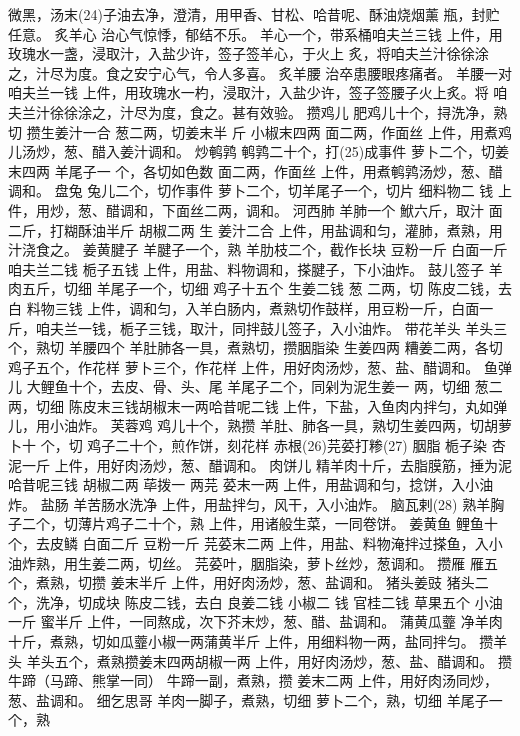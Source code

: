 \documentclass[12pt,UTF8]{ctexbook}
\begin{document}
微黑，汤末(24)子油去净，澄清，用甲香、甘松、哈昔呢、酥油烧烟薰
瓶，封贮任意。
炙羊心 治心气惊悸，郁结不乐。
羊心一个，带系桶咱夫兰三钱
上件，用玫瑰水一盏，浸取汁，入盐少许，签子签羊心，于火上
炙，将咱夫兰汁徐徐涂之，汁尽为度。食之安宁心气，令人多喜。
炙羊腰 治卒患腰眼疼痛者。
羊腰一对 咱夫兰一钱
上件，用玫瑰水一杓，浸取汁，入盐少许，签子签腰子火上炙。将
咱夫兰汁徐徐涂之，汁尽为度，食之。甚有效验。
攒鸡儿
肥鸡儿十个，挦洗净，熟切 攒生姜汁一合 葱二两，切姜末半
斤 小椒末四两 面二两，作面丝
上件，用煮鸡儿汤炒，葱、醋入姜汁调和。
炒鹌鹑
鹌鹑二十个，打(25)成事件 萝卜二个，切姜末四两 羊尾子一
个，各切如色数 面二两，作面丝
上件，用煮鹌鹑汤炒，葱、醋调和。
盘兔
兔儿二个，切作事件 萝卜二个，切羊尾子一个，切片 细料物二
钱
上件，用炒，葱、醋调和，下面丝二两，调和。
河西肺
羊肺一个 鮲六斤，取汁 面二斤，打糊酥油半斤 胡椒二两 生
姜汁二合
上件，用盐调和匀，灌肺，煮熟，用汁浇食之。
姜黄腱子
羊腱子一个，熟 羊肋枝二个，截作长块 豆粉一斤 白面一斤
咱夫兰二钱 栀子五钱
上件，用盐、料物调和，搽腱子，下小油炸。
鼓儿签子
羊肉五斤，切细 羊尾子一个，切细 鸡子十五个 生姜二钱 葱
二两，切 陈皮二钱，去白 料物三钱
上件，调和匀，入羊白肠内，煮熟切作鼓样，用豆粉一斤，白面一
斤，咱夫兰一钱，栀子三钱，取汁，同拌鼓儿签子，入小油炸。
带花羊头
羊头三个，熟切 羊腰四个 羊肚肺各一具，煮熟切，攒胭脂染
生姜四两 糟姜二两，各切 鸡子五个，作花样 萝卜三个，作花样
上件，用好肉汤炒，葱、盐、醋调和。
鱼弹儿
大鲤鱼十个，去皮、骨、头、尾 羊尾子二个，同剁为泥生姜一
两，切细 葱二两，切细 陈皮末三钱胡椒末一两哈昔呢二钱
上件，下盐，入鱼肉内拌匀，丸如弹儿，用小油炸。
芙蓉鸡
鸡儿十个，熟攒 羊肚、肺各一具，熟切生姜四两，切胡萝卜十
个，切 鸡子二十个，煎作饼，刻花样 赤根(26)芫荽打糁(27) 胭脂
栀子染 杏泥一斤
上件，用好肉汤炒，葱、醋调和。
肉饼儿
精羊肉十斤，去脂膜筋，捶为泥 哈昔呢三钱 胡椒二两 荜拨一
两芫 荽末一两
上件，用盐调和匀，捻饼，入小油炸。
盐肠
羊苦肠水洗净
上件，用盐拌匀，风干，入小油炸。
脑瓦剌(28)
熟羊胸子二个，切薄片鸡子二十个，熟
上件，用诸般生菜，一同卷饼。
姜黄鱼
鲤鱼十个，去皮鳞 白面二斤 豆粉一斤 芫荽末二两
上件，用盐、料物淹拌过搽鱼，入小油炸熟，用生姜二两，切丝。
芫荽叶，胭脂染，萝卜丝炒，葱调和。
攒雁
雁五个，煮熟，切攒 姜末半斤
上件，用好肉汤炒，葱、盐调和。
猪头姜豉
猪头二个，洗净，切成块 陈皮二钱，去白 良姜二钱 小椒二
钱 官桂二钱 草果五个 小油一斤 蜜半斤
上件，一同熬成，次下芥末炒，葱、醋、盐调和。
蒲黄瓜虀
净羊肉十斤，煮熟，切如瓜虀小椒一两蒲黄半斤
上件，用细料物一两，盐同拌匀。
攒羊头
羊头五个，煮熟攒姜末四两胡椒一两
上件，用好肉汤炒，葱、盐、醋调和。
攒牛蹄（马蹄、熊掌一同）
牛蹄一副，煮熟，攒 姜末二两
上件，用好肉汤同炒，葱、盐调和。
细乞思哥
羊肉一脚子，煮熟，切细 萝卜二个，熟，切细 羊尾子一个，熟
\end{document}
